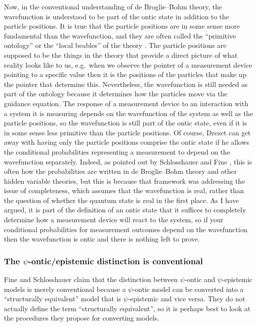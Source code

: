 \documentclass[DIV=calc,paper=a4,fontsize=11pt,twocolumn]{scrartcl} %
\theoremstyle{definition}
\theoremstyle{plain}
\begin{document}
Now, in the conventional understanding of de Broglie--Bohm theory, the
wavefunction is understood to be part of the ontic state in addition
to the particle positions.  It is true that the particle positions are
in some sense more fundamental than the wavefunction, and they are
often called the ``primitive ontology'' \cite{Duerr1992,
Goldstein1998, Goldstein1998a} or the ``local beables'' of the
theory \cite{Bell2004}.  The particle positions are supposed to be the
things in the theory that provide a direct picture of what reality
looks like to us, e.g.\ when we observe the pointer of a measurement
device pointing to a specific value then it is the positions of the
particles that make up the pointer that determine this.  Nevertheless,
the wavefunction is still needed as part of the ontology because it
determines how the particles move via the guidance equation.  The
response of a measurement device to an interaction with a system it is
measuring depends on the wavefunction of the system as well as the
particle positions, so the wavefunction is still part of the ontic
state, even if it is in some sense less primitive than the particle
positions.  Of course, Drezet can get away with having only the
particle positions comprise the ontic state if he allows the
conditional probabilities representing a measurement to depend on the
wavefunction separately.  Indeed, as pointed out by Schlosshauer and
Fine \cite{Schlosshauer2012}, this is often how the probabilities are
written in de Broglie--Bohm theory and other hidden variable theories,
but this is because that framework was addressing the issue of
completeness, which assumes that the wavefunction is real, rather than
the question of whether the quantum state is real in the first place.
As I have argued, it is part of the definition of an ontic state that
it suffices to completely determine how a measurement device will
react to the system, so if your conditional probabilities for
measurement outcomes depend on the wavefunction then the wavefunction
is ontic and there is nothing left to prove.

\subsubsection{The $\psi$-ontic/epistemic distinction is conventional}

\label{Crit:SF1}

Fine and Schlosshauer \cite{Schlosshauer2012} claim that the
distinction between $\psi$-ontic and $\psi$-epistemic models is merely
conventional because a $\psi$-ontic model can be converted into a
``structurally equivalent'' model that is $\psi$-epistemic and vice
versa.  They do not actually define the term ``structurally
equivalent'', so it is perhaps best to look at the procedures they
propose for converting models.
\end{document}
